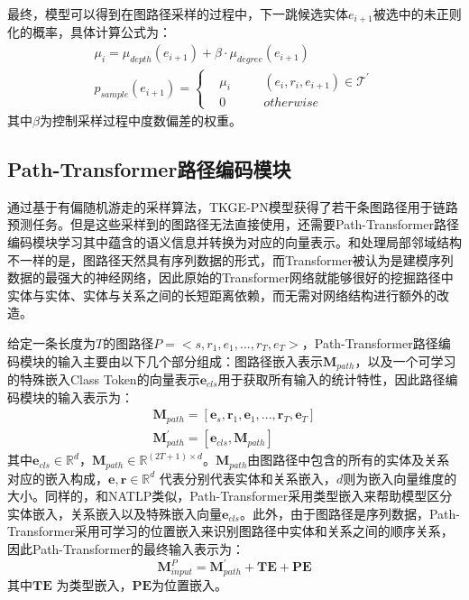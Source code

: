 最终，模型可以得到在图路径采样的过程中，下一跳候选实体$e_{i+1}$被选中的未正则化的概率，具体计算公式为：
\begin{gather}
  \mu_i = \mu_{depth}(e_{i+1})+\beta\cdot\mu_{degree}(e_{i+1})\\
  p_{sample}(e_{i+1})=\left\{
      \begin{aligned}
          &\mu_i &&\quad (e_i,r_i,e_{i+1})\in \mathcal{T}^{\prime} \\
          &0 &&\quad otherwise
      \end{aligned}
  \right.
\end{gather}
其中$\beta$为控制采样过程中度数偏差的权重。

\subsection{Path-Transformer路径编码模块}

通过基于有偏随机游走的采样算法，TKGE-PN模型获得了若干条图路径用于链路预测任务。但是这些采样到的图路径无法直接使用，还需要Path-Transformer路径编码模块学习其中蕴含的语义信息并转换为对应的向量表示。和处理局部邻域结构不一样的是，图路径天然具有序列数据的形式，而Transformer被认为是建模序列数据的最强大的神经网络，因此原始的Transformer网络就能够很好的挖掘路径中实体与实体、实体与关系之间的长短距离依赖，而无需对网络结构进行额外的改造。

给定一条长度为$T$的图路径$P=<s,r_1,e_1,...,r_T,e_T>$，Path-Transformer路径编码模块的输入主要由以下几个部分组成：图路径嵌入表示$\mathbf{M}_{path} $，以及一个可学习的特殊嵌入Class Token的向量表示$\mathbf{e}_{cls}$用于获取所有输入的统计特性，因此路径编码模块的输入表示为：
\begin{gather}
  \mathbf{M}_{path} = [\boldsymbol{e}_s,\boldsymbol{r}_1,\boldsymbol{e}_1,...,\boldsymbol{r}_T,\boldsymbol{e}_T]\\
  \mathbf{M}_{path}^{\prime} = [\boldsymbol{e}_{cls},\mathbf{M}_{path}]
\end{gather}
其中$\boldsymbol{e}_{cls}\in\mathbb{R}^d$，$\mathbf{M}_{path} \in \mathbb{R}^{(2T+1)\times d}$。$\mathbf{M}_{path}$由图路径中包含的所有的实体及关系对应的嵌入构成，$\boldsymbol{e},\boldsymbol{r} \in \mathbb{R}^d$ 代表分别代表实体和关系嵌入，$d$则为嵌入向量维度的大小。同样的，和NATLP类似，Path-Transformer采用类型嵌入来帮助模型区分实体嵌入，关系嵌入以及特殊嵌入向量$\boldsymbol{e}_{cls}$。此外，由于图路径是序列数据，Path-Transformer采用可学习的位置嵌入来识别图路径中实体和关系之间的顺序关系，因此Path-Transformer的最终输入表示为：
\begin{equation}
  \mathbf{M}_{input}^{P} = \mathbf{M}_{path}^{\prime}+\mathbf{TE} + \mathbf{PE}
\end{equation}
其中$\mathbf{TE}$ 为类型嵌入，$\mathbf{PE}$为位置嵌入。

